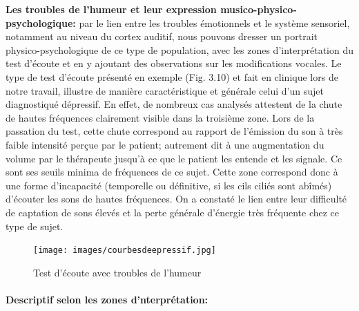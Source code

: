 \textbf{Les troubles de l'humeur et leur expression
	musico-phy\-sico-psy\-cho\-lo\-gi\-que:} par le lien entre les troubles
émotionnels et le
système sensoriel, notamment au niveau du cortex auditif, nous
pouvons dresser un portrait 
physico-psychologique de ce type de population,
 avec les zones d'interprétation du test d'écoute %
et en y ajoutant des observations sur les modifications vocales.
Le type de test d'écoute présenté en exemple (Fig. 3.10) et fait en clinique lors de notre travail,  illustre de 
manière 
caractéristique 
et générale  
celui d'un sujet diagnostiqué dépressif. En effet, de nombreux cas analysés attestent de la 
chute de hautes fréquences 
clairement visible dans la troisième zone. Lors de la passation du test, cette chute correspond au rapport 
de 
l'émission du son à
très faible intensité perçue par le
patient;  autrement dit à une augmentation
du volume
par le thérapeute jusqu'à ce que le patient les entende et les signale.
Ce sont ses seuils minima de fréquences de ce sujet.
Cette zone correspond donc à une forme d'incapacité (temporelle ou définitive, si les cils ciliés sont 
abîmés) d'écouter les sons de 
hautes fréquences. On a constaté le lien entre leur 
difficulté de captation de sons élevés et  la perte générale d'énergie très 
fréquente chez ce type de sujet. %

\begin{figure}[ht]
	\centering
	\texttt{[image: images/courbesdeepressif.jpg]}
	\caption{Test d'écoute avec troubles de l'humeur}
	\label{fig:courbes du dépressif}
\end{figure}


\paragraph{Descriptif selon les zones d'nterprétation:}

